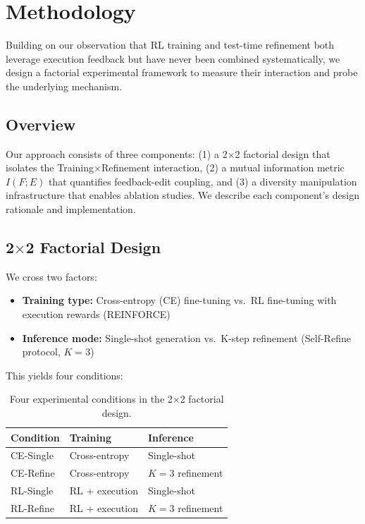 \section{Methodology}
\label{sec:methodology}

Building on our observation that RL training and test-time refinement both leverage execution feedback but have never been combined systematically, we design a factorial experimental framework to measure their interaction and probe the underlying mechanism.

\subsection{Overview}

Our approach consists of three components: (1) a 2$\times$2 factorial design that isolates the Training$\times$Refinement interaction, (2) a mutual information metric $I(F;E)$ that quantifies feedback-edit coupling, and (3) a diversity manipulation infrastructure that enables ablation studies. We describe each component's design rationale and implementation.

\subsection{2$\times$2 Factorial Design}

We cross two factors:

\begin{itemize}
    \item \textbf{Training type:} Cross-entropy (CE) fine-tuning vs.\ RL fine-tuning with execution rewards (REINFORCE)
    \item \textbf{Inference mode:} Single-shot generation vs.\ K-step refinement (Self-Refine protocol, $K=3$)
\end{itemize}

This yields four conditions:

\begin{table}[h]
\centering
\begin{tabular}{@{}lll@{}}
\toprule
Condition & Training & Inference \\
\midrule
CE-Single & Cross-entropy & Single-shot \\
CE-Refine & Cross-entropy & $K=3$ refinement \\
RL-Single & RL + execution & Single-shot \\
RL-Refine & RL + execution & $K=3$ refinement \\
\bottomrule
\end{tabular}
\caption{Four experimental conditions in the 2$\times$2 factorial design.}
\label{tab:conditions}
\end{table}

